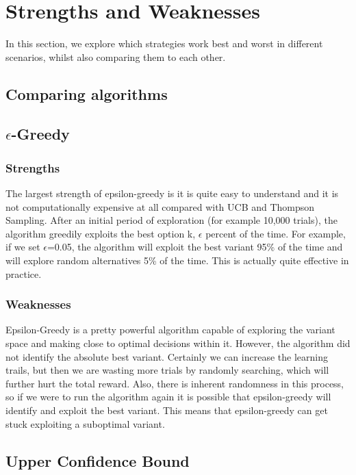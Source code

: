\section{Strengths and Weaknesses}
In this section, we explore which strategies work best and worst in different scenarios, whilst also comparing them to each other.

\subsection{Comparing algorithms}


\subsection{$\epsilon$-Greedy}
\subsubsection{Strengths}
The largest strength of epsilon-greedy is it is quite easy to understand and it is not computationally expensive at all compared with UCB and Thompson Sampling. After an initial period of exploration (for example 10,000 trials), the algorithm greedily exploits the best option k, $\epsilon$ percent of the time. For example, if we set $\epsilon$=0.05, the algorithm will exploit the best variant 95\% of the time and will explore random alternatives 5\% of the time. This is actually quite effective in practice.
\subsubsection{Weaknesses}
Epsilon-Greedy is a pretty powerful algorithm capable of exploring the variant space and making close to optimal decisions within it. However, the algorithm did not identify the absolute best variant. Certainly we can increase the learning trails, but then we are wasting more trials by randomly searching, which will further hurt the total reward. Also, there is inherent randomness in this process, so if we were to run the algorithm again it is possible that epsilon-greedy will identify and exploit the best variant. This means that epsilon-greedy can get stuck exploiting a suboptimal variant.

\subsection{Upper Confidence Bound}
